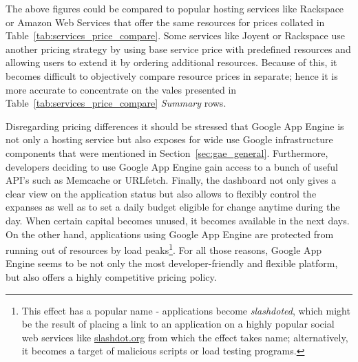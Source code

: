 The above figures could be compared to popular hosting services like Rackspace or Amazon Web Services that offer the same resources for prices collated in Table~\ref{tab:services_price_compare}.
Some services like Joyent or Rackspace use another pricing strategy by using base service price with predefined resources and allowing users to extend it by ordering additional resources. Because of this, it becomes difficult to objectively compare resource prices in separate; hence it is more accurate to concentrate on the vales presented in Table~\ref{tab:services_price_compare} \emph{Summary} rows.   
 
Disregarding pricing differences it should be stressed that Google App Engine is not only a hosting service but also exposes for wide use Google infrastructure components that were mentioned in Section~\ref{sec:gae_general}. Furthermore, developers deciding to use Google App Engine gain access to a bunch of useful API's such as Memcache or URLfetch. Finally, the dashboard not only gives a clear view on the application status but also allows to flexibly control the expanses as well as to set a daily budget eligible for change anytime during the day. When certain capital becomes unused, it becomes available in the next days. On the other hand, applications using Google App Engine are protected from running out of resources by load peaks\footnote{This effect has a popular name - applications become \emph{slashdoted}, which might be the result of placing a link to an application on a highly popular social web services like \url{slashdot.org} from which the effect takes name; alternatively, it becomes a target of malicious scripts or load testing programs.}. For all those reasons, Google App Engine seems to be not only the most developer-friendly and flexible platform, but also offers a highly competitive pricing policy.   
 
